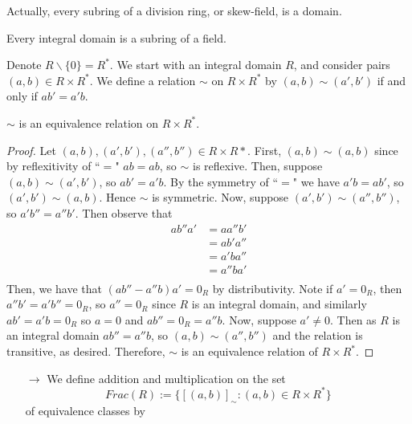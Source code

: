 \begin{remark}
    Actually, every subring of a division ring, or skew-field, is a domain.
\end{remark}

\begin{theorem}
    Every integral domain is a subring of a field.
\end{theorem}

\begin{construction}
    Denote $R\backslash\{0\} = R^*$. We start with an integral domain $R$, and consider pairs $(a,b) \in R\times R^*$. We define a relation $\sim$ on $R\times R^*$ by $(a,b) \sim (a',b')$ if and only if $ab' = a'b$.
    \begin{claim}
        $\sim$ is an equivalence relation on $R\times R^*$.
    \end{claim}
    \begin{proof}
        Let $(a,b),(a',b'), (a'',b'') \in R\times R*$. First, $(a,b)\sim (a,b)$ since by reflexitivity of ``$=$" $ab = ab$, so $\sim$ is reflexive. Then, suppose $(a,b)\sim (a',b')$, so $ab' = a'b$. By the symmetry of ``$=$" we have $a'b = ab'$, so $(a',b') \sim (a,b)$. Hence $\sim$ is symmetric. Now, suppose $(a',b') \sim (a'',b'')$, so $a'b'' = a''b'$. Then observe that \begin{align*}
            ab''a' &= aa''b'\\
            &= ab'a'' \tag{commutivity}\\
            &= a'ba'' \\
            &= a''ba' \tag{commutivity} \\
        \end{align*}
        Then, we have that $(ab'' - a''b)a' = 0_R$ by distributivity. Note if $a' = 0_R$, then $a''b' = a'b'' = 0_R$, so $a'' = 0_R$ since $R$ is an integral domain, and similarly $ab' = a'b = 0_R$ so $a=0$ and $ab'' = 0_R = a''b$. Now, suppose $a' \neq 0$. Then as $R$ is an integral domain $ab'' = a''b$, so $(a,b) \sim (a'',b'')$ and the relation is transitive, as desired. Therefore, $\sim$ is an equivalence relation of $R\times R^*$.
    \end{proof}
    \begin{enumerate}
        \item[$\rightarrow$] We define addition and multiplication on the set \begin{equation}
            Frac(R) := \{[(a,b)]_{\sim}:(a,b) \in R\times R^*\}
        \end{equation}
        of equivalence classes by \begin{equation}

\end{equation}
\end{enumerate}
\end{construction}
